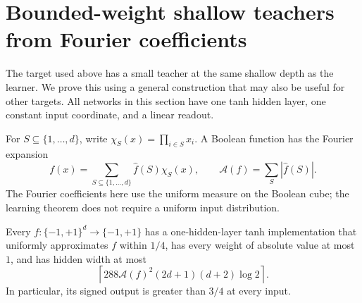 \section{Bounded-weight shallow teachers from Fourier coefficients}
\label{sec:teacher}

The target used above has a small teacher at the same shallow depth as
 the learner.  We prove this using a general construction that may also be
 useful for other targets.  All networks in this section have one tanh
 hidden layer, one constant input coordinate, and a linear readout.

For $S\subseteq\{1,\ldots,d\}$, write
$\chi_S(x)=\prod_{i\in S}x_i$.  A Boolean function has the Fourier expansion
\[
 f(x)=\sum_{S\subseteq\{1,\ldots,d\}}\widehat f(S)\chi_S(x),
 \qquad
 \mathcal A(f)=\sum_S|\widehat f(S)|.
\]
The Fourier coefficients here use the uniform measure on the Boolean
cube; the learning theorem does not require a uniform input distribution.

\begin{theorem}\label{thm:fourier-teacher}
Every $f:\{-1,+1\}^d\to\{-1,+1\}$ has a one-hidden-layer tanh
implementation that uniformly approximates $f$ within $1/4$, has every
weight of absolute value at most $1$, and has hidden width at most
\begin{equation}\label{eq:teacher-width}
 \left\lceil
 288\mathcal A(f)^2(2d+1)(d+2)\log 2
 \right\rceil.
\end{equation}
In particular, its signed output is greater than $3/4$ at every input.
\end{theorem}


